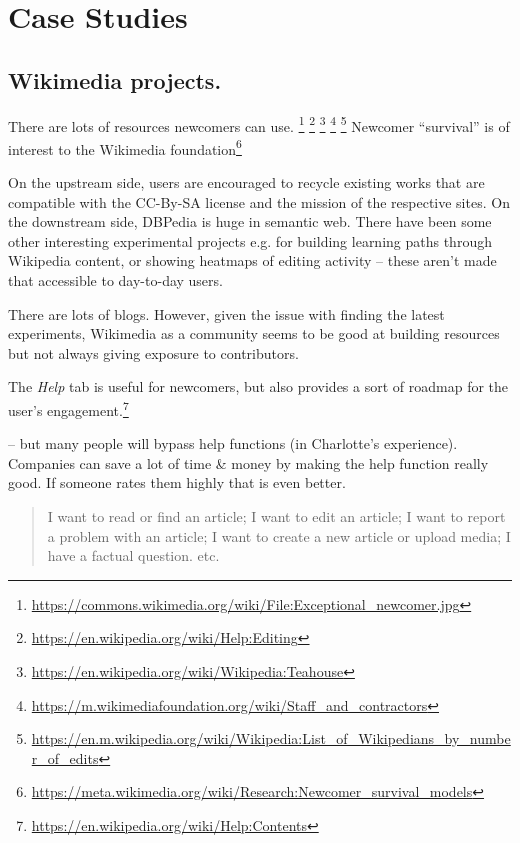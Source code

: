 \section{Case Studies}\label{sec:Case Studies}

\subsection{Wikimedia projects.}

 There are lots of resources newcomers can use.
\footnote{\url{https://commons.wikimedia.org/wiki/File:Exceptional_newcomer.jpg}}
\footnote{\url{https://en.wikipedia.org/wiki/Help:Editing}}
\footnote{\url{https://en.wikipedia.org/wiki/Wikipedia:Teahouse}}
\footnote{\url{https://m.wikimediafoundation.org/wiki/Staff_and_contractors}}
\footnote{\url{https://en.m.wikipedia.org/wiki/Wikipedia:List_of_Wikipedians_by_number_of_edits}}
Newcomer ``survival'' is of interest to the Wikimedia foundation\footnote{\url{https://meta.wikimedia.org/wiki/Research:Newcomer_survival_models}}

 On the upstream side, users are
encouraged to recycle existing works that are compatible with the
CC-By-SA license and the mission of the respective sites.  On the
downstream side, DBPedia is huge in semantic web.  There have been
some other interesting experimental projects e.g. for building
learning paths through Wikipedia content, or showing heatmaps of
editing activity -- these aren't made that accessible to day-to-day
users.

 There are lots of blogs.  However, given the
issue with finding the latest experiments, Wikimedia as a community
seems to be good at building resources but not always giving exposure
to contributors.

 The \emph{Help} tab is useful for newcomers, but
also provides a sort of roadmap for the user's
engagement.\footnote{\url{https://en.wikipedia.org/wiki/Help:Contents}}

-- but many people will bypass help functions (in Charlotte's
experience).  Companies can save a lot of time \& money by making the
help function really good.  If someone rates them highly that is even
better.

\begin{quotation}
\noindent 
I want to read or find an article;
I want to edit an article;
I want to report a problem with an article;
I want to create a new article or upload media;
I have a factual question.
etc.
\end{quotation}

